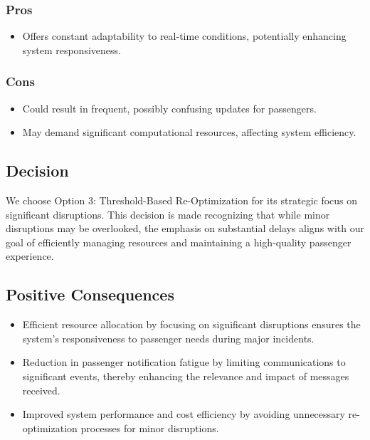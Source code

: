 \subsubsection*{Pros}
\begin{itemize}
    \item Offers constant adaptability to real-time conditions, potentially enhancing system responsiveness.
\end{itemize}
\subsubsection*{Cons}
\begin{itemize}
    \item Could result in frequent, possibly confusing updates for passengers.
    \item May demand significant computational resources, affecting system efficiency.
\end{itemize}


\subsection*{Decision}
We choose Option 3: Threshold-Based Re-Optimization for its strategic focus on significant disruptions. This decision is made recognizing that while minor disruptions may be overlooked, the emphasis on substantial delays aligns with our goal of efficiently managing resources and maintaining a high-quality passenger experience.

\subsection*{Positive Consequences}
\begin{itemize}
    \item Efficient resource allocation by focusing on significant disruptions ensures the system's responsiveness to passenger needs during major incidents.
    \item Reduction in passenger notification fatigue by limiting communications to significant events, thereby enhancing the relevance and impact of messages received.
    \item Improved system performance and cost efficiency by avoiding unnecessary re-optimization processes for minor disruptions.
\end{itemize}


